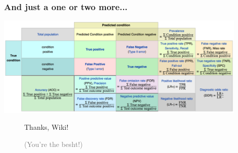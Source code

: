 \documentclass[xcolor={dvipsnames}]{beamer}
\begin{document}
\frame
{
\frametitle{And just a one or two more...}

\vspace{2em}

\hspace*{-.25in}\includegraphics[width=4.75in]{stuff/terminology.png}

\begin{figure}
\centering
Thanks, Wiki! 

\footnotesize
\textcolor{gray}{(You're the besht!)}
\end{figure}

}
\end{document}
